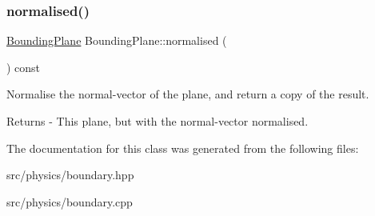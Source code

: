 \subsubsection{\texorpdfstring{normalised()}{normalised()}}
{\footnotesize\ttfamily \mbox{\hyperlink{class_bounding_plane}{Bounding\+Plane}} Bounding\+Plane\+::normalised (\begin{DoxyParamCaption}{ }\end{DoxyParamCaption}) const}

Normalise the normal-\/vector of the plane, and return a copy of the result. \begin{DoxyReturn}{Returns}
-\/ This plane, but with the normal-\/vector normalised. 
\end{DoxyReturn}


The documentation for this class was generated from the following files\+:\begin{DoxyCompactItemize}
\item 
src/physics/boundary.\+hpp\item 
src/physics/boundary.\+cpp\end{DoxyCompactItemize}
